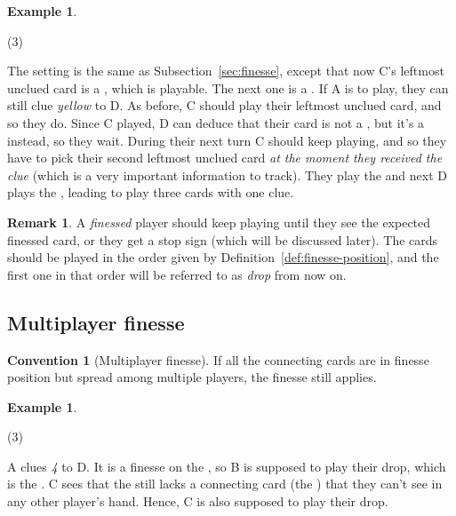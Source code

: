 \documentclass[a4paper]{article}
\theoremstyle{plain}
\theoremstyle{definition}
\newtheorem{remark}[theorem]{Remark}
\newtheorem{example}[theorem]{Example}
\newtheorem{convention}[theorem]{Convention}
\begin{document}
\begin{example}
	\hfill
	\begin{tasks}(3)
		\task[+]      
		\task[A]    
		\task[B]    
		\task[C]    
		\task[D]    
		\task[E]    
	\end{tasks}
	
	The setting is the same as Subsection~\ref{sec:finesse}, except that now C's leftmost unclued card is a , which is playable. The next one is a . If A is to play, they can still clue \textit{yellow} to D. As before, C should play their leftmost unclued card, and so they do. Since C played, D can deduce that their card is not a , but it's a  instead, so they wait. During their next turn C should keep playing, and so they have to pick their second leftmost unclued card \textit{at the moment they received the clue} (which is a very important information to track). They play the  and next D plays the , leading to play three cards with one clue.
\end{example}

\begin{remark}
	A \textit{finessed} player should keep playing until they see the expected finessed card, or they get a stop sign (which will be discussed later). The cards should be played in the order given by Definition~\ref{def:finesse-position}, and the first one in that order will be referred to as \emph{drop} from now on.
\end{remark}

\subsection{Multiplayer finesse}

\begin{convention}[Multiplayer finesse]
	\label{multiplayer-finesse}
	If all the connecting cards are in finesse position but spread among multiple players, the finesse still applies.
\end{convention}

\begin{example}
	\hfill
	\begin{tasks}(3)
		\task[+]      
		\task[A]    
		\task[B]    
		\task[C]    
		\task[D]    
		\task[E]    
	\end{tasks}
	
	A clues \textit{4} to D. It is a finesse on the , so B is supposed to play their drop, which is the . C sees that the  still lacks a connecting card (the ) that they can't see in any other player's hand. Hence, C is also supposed to play their drop.
\end{example}
\end{document}
